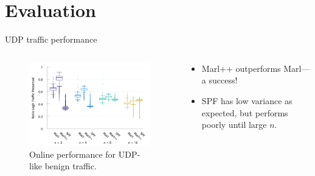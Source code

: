 \documentclass[aspectratio=169,xcolor={dvipsnames}
,hide notes
]{beamer}
\begin{document}
\section{Evaluation}
\begin{frame}{UDP traffic performance}
\begin{columns}
	\begin{column}{0.7\linewidth}
	\begin{figure}
		\centering
		\includegraphics[width=0.95\linewidth]{../plots/udp-box-pres}
		
		\caption{
			Online performance for UDP-like benign traffic.
			\label{fig:udp-box}
		}
	\end{figure}
	\end{column}
	\begin{column}{0.3\linewidth}
		\begin{itemize}
			\item Marl++ outperforms Marl---a success!
			\item SPF has low variance as expected, but performs poorly until large $n$.
		\end{itemize}
	\end{column}
\end{columns}
\end{frame}
\end{document}
